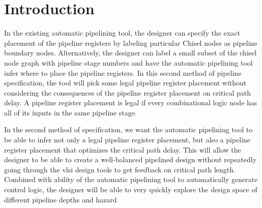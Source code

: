 \section{Introduction}
In the existing automatic pipelining tool, the designer can specify the exact placement of the pipeline registers by labeling particular Chisel nodes as pipeline boundary nodes. Alternatively, the designer can label a small subset of the chisel node graph with pipeline stage numbers and have the automatic pipelining tool infer where to place the pipeline registers. In this second method of pipeline specification, the tool will pick some legal pipeline register placement without considering the consequences of the pipeline register placement on critical path delay. A pipeline register placement is legal if every combinational logic node has all of its inputs in the same pipeline stage.

In the second method of specification, we want the automatic pipelining tool to be able to infer not only a legal pipeline register placement, but also a pipeline register placement that optimizes the critical path delay.  This will allow the designer to be able to create a well-balanced pipelined design without repeatedly going through the vlsi design tools to get feedback on critical path length.  Combined with ability of the automatic pipelining tool to automatically generate control logic, the designer will be able to very quickly explore the design space of different pipeline depths and hazard 
